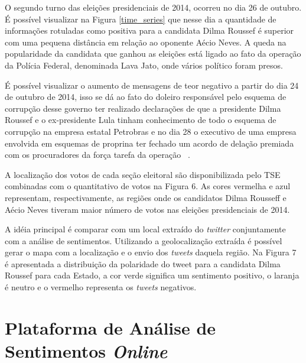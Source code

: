 O segundo turno das eleições presidenciais de 2014, ocorreu no dia 26 de outubro. É possível visualizar na Figura \ref{time_series} que nesse dia
a quantidade de informações rotuladas como positiva para a candidata Dilma Roussef é superior com uma pequena distância em relação ao oponente Aécio
Neves. A queda na popularidade da candidata que ganhou as eleições está ligado ao fato da operação da Polícia Federal, denominada Lava Jato, onde
vários político foram presos. 

É possível visualizar o aumento de mensagens de teor negativo a partir do dia 24 de outubro de 2014, isso se dá ao fato do doleiro 
responsável pelo esquema de corrupção desse governo ter realizado declarações de que a presidente Dilma Roussef e o ex-presidente Lula tinham 
conhecimento de todo o esquema de corrupção na empresa estatal Petrobras e no dia 28 o executivo de uma empresa envolvida em esquemas de proprina
ter fechado um acordo de delação premiada com os procuradores da força tarefa da operação ~\cite{LavaJato}. 


A localização dos votos de cada seção eleitoral são disponibilizada pelo \acrshort{TSE}
combinadas com o quantitativo de votos na Figura 6. As cores
vermelha e azul representam, respectivamente, as regiões onde
os candidatos Dilma Rousseff e Aécio Neves tiveram maior número de votos nas eleições presidenciais de 2014.

A idéia principal é comparar com um local extraído do \textit{twitter}
conjuntamente com a análise de sentimentos.
Utilizando a geolocalização extraída é possível gerar o mapa
com a localização e o envio dos \textit{tweets} daquela região. Na
Figura 7 é apresentada a distribuição da polaridade do tweet
para a candidata Dilma Roussef para cada Estado, a cor
verde significa um sentimento positivo, o laranja é neutro e
o vermelho representa os \textit{tweets} negativos.

\section{Plataforma de Análise de Sentimentos \textit{Online}}